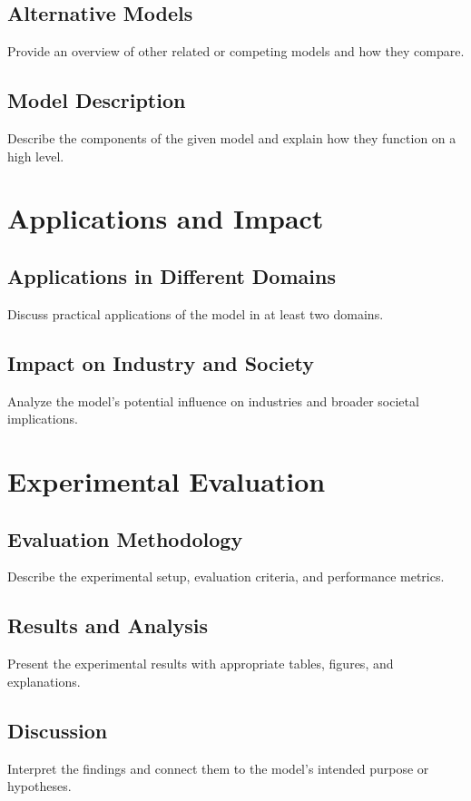 \documentclass[12pt]{article}
\begin{document}
\subsection{Alternative Models}
Provide an overview of other related or competing models and how they compare.

\subsection{Model Description}
Describe the components of the given model and explain how they function on a high level.

\section{Applications and Impact}

\subsection{Applications in Different Domains}
Discuss practical applications of the model in at least two domains.

\subsection{Impact on Industry and Society}
Analyze the model’s potential influence on industries and broader societal implications.

\section{Experimental Evaluation}

\subsection{Evaluation Methodology}
Describe the experimental setup, evaluation criteria, and performance metrics.

\subsection{Results and Analysis}
Present the experimental results with appropriate tables, figures, and explanations.

\subsection{Discussion}
Interpret the findings and connect them to the model’s intended purpose or hypotheses.
\end{document}

